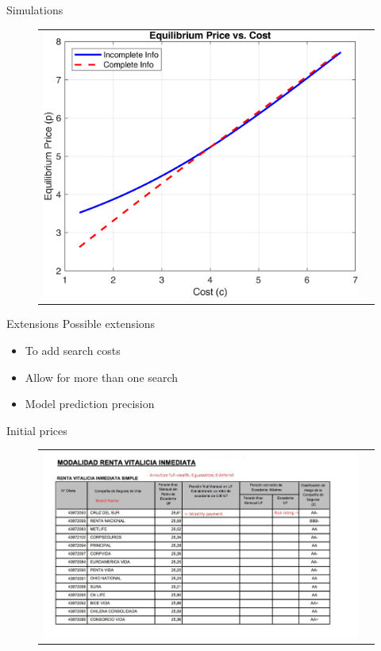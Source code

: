 \documentclass[10pt,aspectratio=169]{beamer}
\begin{document}
\begin{frame}{Simulations }
\begin{figure}[H]
\centering{}%
\begin{tabular}{cc}
\includegraphics[scale=0.7]{../figures/simulations/model5/pricesCI_IC.png}
\end{tabular}
\end{figure}
\end{frame}

\begin{frame}{Extensions}
Possible extensions
\begin{itemize}
    \item To add search costs
    \item Allow for more than one search 
    \item Model prediction precision 
\end{itemize}
\end{frame}

\begin{frame}{Initial prices}\label{slide:fig_offer_certificate}    
\begin{figure}[H]
\centering{}%
\begin{tabular}{cc}
\includegraphics[scale=0.49]{../figures/annuity_offer.png}
\end{tabular}
\end{figure}
\hyperlink{slide:setting2}{} 
\hyperlink{slide:data}{}
\end{frame}
\end{document}
